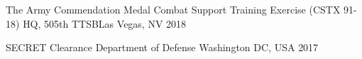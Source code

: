 



\begin{cvhonors}

  \cvhonor
    {The Army Commendation Medal} %
    {Combat Support Training Exercise (CSTX 91-18)} %
    {HQ, 505th TTSB\linebreak Las Vegas, NV} %
    {2018} %
    
  \cvhonor
    {SECRET Clearance} %
    {Department of Defense} %
    {Washington DC, USA} %
    {2017} %

\end{cvhonors}








